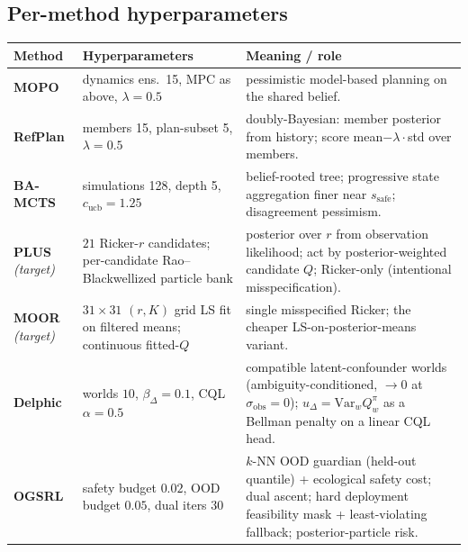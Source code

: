 \documentclass[11pt]{article}
\newcommand{\sobs}{\sigma_{\mathrm{obs}}}
\newcommand{\sthr}{s_{\mathrm{safe}}}
\begin{document}
\subsection{Per-method hyperparameters}
\begin{longtable}{@{}p{2.2cm}p{5.3cm}p{6.5cm}@{}}
\toprule
Method & Hyperparameters & Meaning / role \\
\midrule
\textbf{MOPO} & dynamics ens.\ 15, MPC as above, $\lambda{=}0.5$ & pessimistic model-based planning on the shared belief. \\
\textbf{RefPlan} & members 15, plan-subset 5, $\lambda{=}0.5$ & doubly-Bayesian: member posterior from history; score mean$-\lambda\cdot$std over members. \\
\textbf{BA-MCTS} & simulations 128, depth 5, $c_{\mathrm{ucb}}{=}1.25$ & belief-rooted tree; progressive state aggregation finer near $\sthr$; disagreement pessimism. \\
\textbf{PLUS}\,\emph{(target)} & $21$ Ricker-$r$ candidates; per-candidate Rao--Blackwellized particle bank & posterior over $r$ from observation likelihood; act by posterior-weighted candidate $Q$; Ricker-only (intentional misspecification). \\
\textbf{MOOR}\,\emph{(target)} & $31{\times}31$ $(r,K)$ grid LS fit on filtered means; continuous fitted-$Q$ & single misspecified Ricker; the cheaper LS-on-posterior-means variant. \\
\textbf{Delphic} & worlds $10$, $\beta_\Delta{=}0.1$, CQL $\alpha{=}0.5$ & compatible latent-confounder worlds (ambiguity-conditioned, $\to 0$ at $\sobs{=}0$); $u_\Delta{=}\mathrm{Var}_w Q^\pi_w$ as a Bellman penalty on a linear CQL head. \\
\textbf{OGSRL} & safety budget $0.02$, OOD budget $0.05$, dual iters $30$ & $k$-NN OOD guardian (held-out quantile) + ecological safety cost; dual ascent; hard deployment feasibility mask + least-violating fallback; posterior-particle risk. \\
\bottomrule
\end{longtable}
\end{document}
